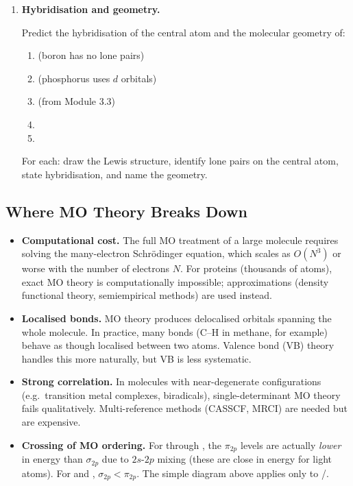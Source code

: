 \documentclass[12pt, a4paper]{book}
\begin{document}
\begin{problembox}
\begin{enumerate}[label=\textbf{\arabic*.}]
  \item \textbf{Hybridisation and geometry.}

    Predict the hybridisation of the central atom and
    the molecular geometry of:
    \begin{enumerate}[label=(\alph*)]
      \item {} (boron has no lone pairs)
      \item {} (phosphorus uses $d$ orbitals)
      \item {} (from Module 3.3)
      \item {}
      \item {}
    \end{enumerate}
    For each: draw the Lewis structure, identify lone pairs
    on the central atom, state hybridisation, and name the geometry.
\end{enumerate}
\end{problembox}

\subsection*{Where MO Theory Breaks Down}

\begin{modelbreaks}
\begin{itemize}[nosep, leftmargin=2em]
  \item \textbf{Computational cost.} The full MO treatment of a
        large molecule requires solving the many-electron
        Schr\"{o}dinger equation, which scales as $O(N^3)$
        or worse with the number of electrons $N$.
        For proteins (thousands of atoms), exact MO theory
        is computationally impossible; approximations
        (density functional theory, semiempirical methods)
        are used instead.

  \item \textbf{Localised bonds.} MO theory produces delocalised
        orbitals spanning the whole molecule.
        In practice, many bonds (C--H in methane, for example)
        behave as though localised between two atoms.
        Valence bond (VB) theory handles this more naturally,
        but VB is less systematic.

  \item \textbf{Strong correlation.} In molecules with
        near-degenerate configurations (e.g.\ transition metal
        complexes, biradicals), single-determinant MO theory
        fails qualitatively.
        Multi-reference methods (CASSCF, MRCI) are needed
        but are expensive.

  \item \textbf{Crossing of MO ordering.} For  through
        , the $\pi_{2p}$ levels are actually
        \emph{lower} in energy than $\sigma_{2p}$ due to
        $2s$-$2p$ mixing (these are close in energy for
        light atoms).
        For  and , $\sigma_{2p} < \pi_{2p}$.
        The simple diagram above applies only to /.
\end{itemize}
\end{modelbreaks}
\end{document}
